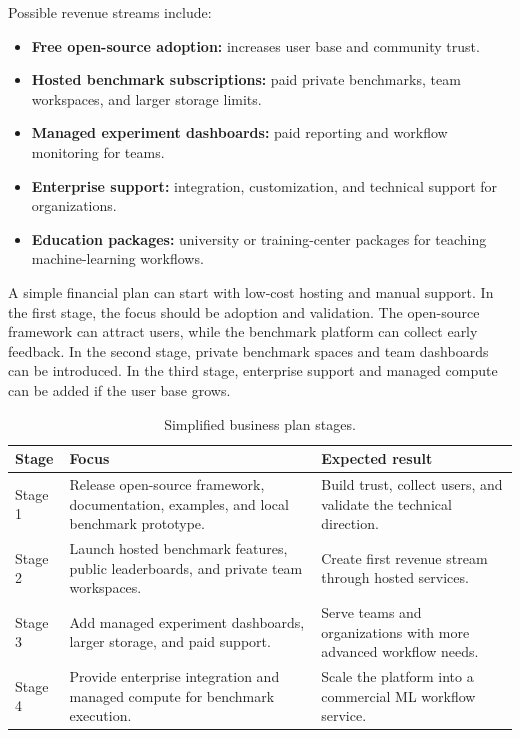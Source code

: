\documentclass[12pt,a4paper]{report}
\newcommand{\acceleraTableStyle}{%
\small
\renewcommand{\arraystretch}{1.15}
\setlength{\tabcolsep}{4pt}%
}
\begin{document}
Possible revenue streams include:

\begin{itemize}
  \item \textbf{Free open-source adoption:} increases user base and community
  trust.
  \item \textbf{Hosted benchmark subscriptions:} paid private benchmarks, team
  workspaces, and larger storage limits.
  \item \textbf{Managed experiment dashboards:} paid reporting and workflow
  monitoring for teams.
  \item \textbf{Enterprise support:} integration, customization, and technical
  support for organizations.
  \item \textbf{Education packages:} university or training-center packages for
  teaching machine-learning workflows.
\end{itemize}

A simple financial plan can start with low-cost hosting and manual support. In
the first stage, the focus should be adoption and validation. The open-source
framework can attract users, while the benchmark platform can collect early
feedback. In the second stage, private benchmark spaces and team dashboards can
be introduced. In the third stage, enterprise support and managed compute can be
added if the user base grows.

\begin{table}[!htbp]
\centering
\acceleraTableStyle
\caption{Simplified business plan stages.}
\label{tab:business-plan-stages}
\begin{tabular}{p{}p{}p{}}
\toprule
\textbf{Stage} & \textbf{Focus} & \textbf{Expected result} \\
\midrule

Stage 1 &
Release open-source framework, documentation, examples, and local benchmark
prototype. &
Build trust, collect users, and validate the technical direction. \\
\midrule

Stage 2 &
Launch hosted benchmark features, public leaderboards, and private team
workspaces. &
Create first revenue stream through hosted services. \\
\midrule

Stage 3 &
Add managed experiment dashboards, larger storage, and paid support. &
Serve teams and organizations with more advanced workflow needs. \\
\midrule

Stage 4 &
Provide enterprise integration and managed compute for benchmark execution. &
Scale the platform into a commercial ML workflow service. \\

\bottomrule
\end{tabular}
\end{table}
\end{document}
